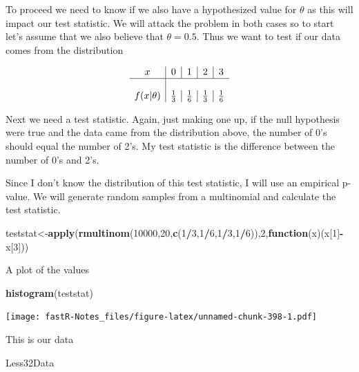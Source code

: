 \documentclass[]{book}
\newenvironment{Shaded}{\begin{snugshade}}{\end{snugshade}}
\newcommand{\KeywordTok}[1]{\textcolor[rgb]{0.13,0.29,0.53}{\textbf{#1}}}
\newcommand{\DecValTok}[1]{\textcolor[rgb]{0.00,0.00,0.81}{#1}}
\newcommand{\ControlFlowTok}[1]{\textcolor[rgb]{0.13,0.29,0.53}{\textbf{#1}}}
\newcommand{\OperatorTok}[1]{\textcolor[rgb]{0.81,0.36,0.00}{\textbf{#1}}}
\newcommand{\NormalTok}[1]{#1}
\theoremstyle{definition}
\theoremstyle{definition}
\theoremstyle{definition}
\theoremstyle{remark}
\begin{document}
To proceed we need to know if we also have a hypothesized value for
\(\theta\) as this will impact our test statistic. We will attack the
problem in both cases so to start let's assume that we also believe that
\(\theta = 0.5\). Thus we want to test if our data comes from the
distribution

\[
\begin{array}{c|c|c|c|c} 
x & 0 & 1 & 2 & 3 \\ \hline \\ f(x|\theta) & {1 \over 3} & {1 \over 6} & {1 \over 3} & {1 \over 6}
\end{array} 
\]

Next we need a test statistic. Again, just making one up, if the null
hypothesis were true and the data came from the distribution above, the
number of 0's should equal the number of 2's. My test statistic is the
difference between the number of 0's and 2's.

Since I don't know the distribution of this test statistic, I will use
an empirical p-value. We will generate random samples from a multinomial
and calculate the test statistic.

\begin{Shaded}
\begin{Highlighting}[]
\NormalTok{teststat<-}\KeywordTok{apply}\NormalTok{(}\KeywordTok{rmultinom}\NormalTok{(}\DecValTok{10000}\NormalTok{,}\DecValTok{20}\NormalTok{,}\KeywordTok{c}\NormalTok{(}\DecValTok{1}\OperatorTok{/}\DecValTok{3}\NormalTok{,}\DecValTok{1}\OperatorTok{/}\DecValTok{6}\NormalTok{,}\DecValTok{1}\OperatorTok{/}\DecValTok{3}\NormalTok{,}\DecValTok{1}\OperatorTok{/}\DecValTok{6}\NormalTok{)),}\DecValTok{2}\NormalTok{,}\ControlFlowTok{function}\NormalTok{(x)(x[}\DecValTok{1}\NormalTok{]}\OperatorTok{-}\NormalTok{x[}\DecValTok{3}\NormalTok{]))}
\end{Highlighting}
\end{Shaded}

A plot of the values

\begin{Shaded}
\begin{Highlighting}[]
\KeywordTok{histogram}\NormalTok{(teststat)}
\end{Highlighting}
\end{Shaded}

\texttt{[image: fastR-Notes\_files/figure-latex/unnamed-chunk-398-1.pdf]}

This is our data

\begin{Shaded}
\begin{Highlighting}[]
\NormalTok{Less32Data}
\end{Highlighting}
\end{Shaded}
\end{document}

